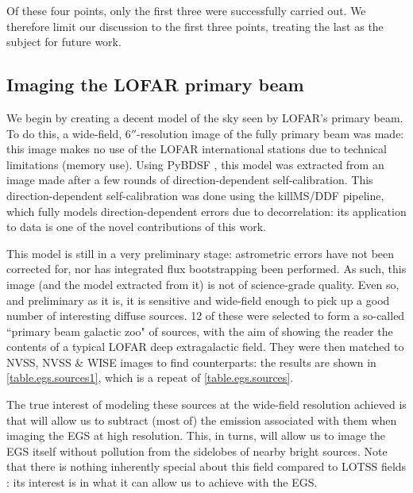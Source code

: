 \pg
Of these four points, only the first three were successfully carried out. %
We therefore limit our discussion to the first three points, treating the last as the subject for future work.

\subsection{Imaging the LOFAR primary beam}

\pg
We begin by creating a decent model of the sky seen by LOFAR's primary beam. To do this, a wide-field, $6''$-resolution image of the fully primary beam was made: this image makes no use of the LOFAR international stations due to technical limitations (memory use). Using PyBDSF , this model was extracted from an image made after a few rounds of direction-dependent self-calibration. This direction-dependent self-calibration was done using the killMS/DDF pipeline, which fully models direction-dependent errors due to decorrelation: its application to data is one of the novel contributions of this work.

\pg
This model is still in a very preliminary stage: astrometric errors have not been corrected for, nor has integrated flux bootstrapping been performed. As such, this image (and the model extracted from it) is not of science-grade quality. Even so, and preliminary as it is, it is sensitive and wide-field enough to pick up a good number of interesting diffuse sources. 12 of these were selected to form a so-called ``primary beam galactic zoo" of sources, with the aim of showing the reader the contents of a typical LOFAR deep extragalactic field. They were then matched to NVSS, NVSS \& WISE images to find counterparts: the results are shown in \cref{table.egs.sources1}, which is a repeat of \cref{table.egs.sources}.

\pg
The true interest of modeling these sources at the wide-field resolution achieved is that will allow us to subtract (most of) the emission associated with them when imaging the EGS at high resolution. This, in turns, will allow us to image the EGS itself without pollution from the sidelobes of nearby bright sources. Note that there is nothing inherently special about this field compared to LOTSS fields : its interest is in what it can allow us to achieve with the EGS.

